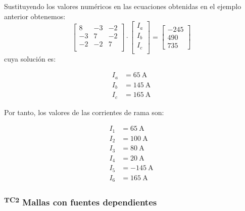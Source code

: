 \begin{example}
          Sustituyendo los valores numéricos en las ecuaciones
          obtenidas en el ejemplo anterior obtenemos:
          \[
            \left[\begin{array}{ccc}
                    8 & -3 & -2 \\
                    -3 & 7 & -2 \\
                    -2 & -2 & 7\\
                  \end{array}\right]%
                \cdot \left[\begin{array}{c}
                              I_a\\
                              I_b\\
                              I_c\\
                            \end{array}\right]%
                          = \left[\begin{array}{c}
                                    -245\\
                                    490\\
                                    735
                                  \end{array}\right]
                              \]
                              cuya solución es:

\begin{align*}
  I_a &= \SI{65}{\ampere}\\
  I_b &= \SI{145}{\ampere}\\
  I_c &= \SI{165}{\ampere}
\end{align*}

Por tanto, los valores de las corrientes de rama son:

\begin{align*}
  I_1 &= \SI{65}{\ampere}\\
  I_2 &= \SI{100}{\ampere}\\
  I_3 &= \SI{80}{\ampere}\\
  I_4 &= \SI{20}{\ampere}\\
  I_5 &= \SI{-145}{\ampere}\\
  I_6 &= \SI{165}{\ampere}
\end{align*}
\end{example}

\subsubsection{\textsuperscript{TC2} Mallas con fuentes dependientes}
\label{sec:mallas-fuentes-dependientes}


